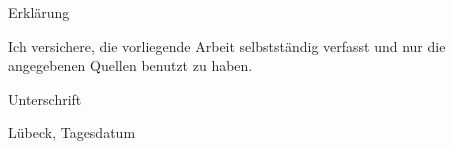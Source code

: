 \Large
Erklärung
\newline
\vspace{3\baselineskip}
\normalsize
\noindent

Ich versichere, die vorliegende Arbeit selbstständig verfasst und nur die angegebenen Quellen benutzt zu haben.


\vspace{5\baselineskip}


Unterschrift 

Lübeck, Tagesdatum
